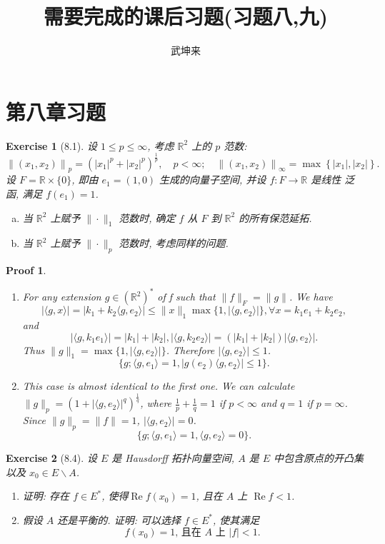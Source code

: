 \documentclass[hyperref,UTF8]{ctexart}
\title{需要完成的课后习题(习题八,九)}
\author{武坤来}
\newtheorem{ex}{Exercise}[section]
\newtheorem{pf}{Proof}[section]
\newcommand{\lrangle}[2]{\langle #1, #2 \rangle}
\begin{document}
\section{第八章习题}

\begin{ex}[8.1]
设 $1 \leqslant p \leqslant \infty$, 考虑 $\mathbb{R}^{2}$ 上的 $p$ 范数:
$$
\left\|\left(x_{1}, x_{2}\right)\right\|_{p}=\left(\left|x_{1}\right|^{p}+\left|x_{2}\right|^{p}\right)^{\frac{1}{p}}, \quad p<\infty ; \quad\left\|\left(x_{1}, x_{2}\right)\right\|_{\infty}=\max \left\{\left|x_{1}\right|,\left|x_{2}\right|\right\} .
$$
设 $F=\mathbb{R} \times\{0\}$, 即由 $e_{1}=(1,0)$ 生成的向量子空间, 并设 $f: F \rightarrow \mathbb{R}$ 是线性 泛函, 满足 $f\left(e_{1}\right)=1$.
    \begin{enumerate}[(a)]
        \item 当 $\mathbb{R}^{2}$ 上赋予 $\|\cdot\|_{1}$ 范数时, 确定 $f$ 从 $F$ 到 $\mathbb{R}^{2}$ 的所有保范延拓.
        \item 当 $\mathbb{R}^{2}$ 上赋予 $\|\cdot\|_{p}$ 范数时, 考虑同样的问题.
    \end{enumerate}
\end{ex}

\begin{pf}
    \begin{enumerate}
        \item For any extension $g\in (\mathbb R^2)^*$ of f such that $\|f\|_F = \|g\|$. We have
        \[
            |\lrangle{g}{x}| = 
            |k_1 + k_2\lrangle{g}{e_2}|\leq
            \|x\|_1\max\{1, |\lrangle{g}{e_2}|\}, \forall x = k_1e_1 + k_2e_2, 
        \]
        and
        \[
            |\langle g, k_1e_1\rangle| = |k_1| + |k_2|, |\langle g, k_2e_2\rangle| = (|k_1| + |k_2|)|\langle g, e_2\rangle|.
        \]
        Thus $\|g\|_1 = \max\{1, |\langle g, e_2\rangle|\}$. Therefore $|\langle g, e_2\rangle| \leq 1$. 
        \[\{g; \langle g, e_1\rangle = 1, |g(e_2)\langle g, e_2\rangle|\leq 1\}. \]
        \item This case is almost identical to the first one. We can calculate $\|g\|_p = (1 + |\langle g, e_2\rangle|^q)^{\frac1q}$, where $\frac1p + \frac1q = 1$ if $p < \infty$ and $q = 1$ if $p = \infty$. Since $\|g\|_p = \|f\| = 1$, $|\langle g, e_2\rangle| = 0$.
        \[\{g; \langle g, e_1\rangle = 1, \langle g, e_2\rangle=0\}. \] 
    \end{enumerate}
\end{pf}

\begin{ex}[8.4]
    设 $E$ 是 Hausdorff 拓扑向量空间, $A$ 是 $E$ 中包含原点的开凸集以及 $x_{0} \in E \backslash A$.
\begin{enumerate}
    \item 证明: 存在 $f \in E^{*}$, 使得$\operatorname{Re} f\left(x_{0}\right)=1$, 且在 $A$ 上 $\operatorname{Re} f<1$.
    \item 假设 $A$ 还是平衡的. 证明: 可以选择 $f \in E^{*}$, 使其满足
    $$
    f\left(x_{0}\right)=1 \text {, 且在 } A \text { 上 }|f|<1 \text {. }
    $$
\end{enumerate}
\end{ex}
\end{document}
